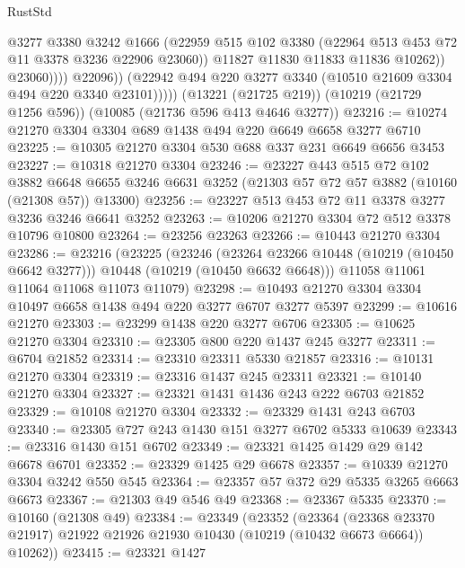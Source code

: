 \begin{lexlean}{RustStd}
\begin{coremodule}
                          @3277
                          @3380
                          @3242
                          @1666
                          (@22959
                            @515
                            @102
                            @3380
                            (@22964 @513 @453 @72 @11 @3378 @3236 @22906 @23060))
                          @11827
                          @11830
                          @11833
                          @11836
                          @10262))
                      @23060))))
              @22096))
          (@22942 @494 @220 @3277 @3340 (@10510 @21609 @3304 @494 @220 @3340 @23101)))))
    (@13221 (@21725 @219))
    (@10219 (@21729 @1256 @596))
    (@10085 (@21736 @596 @413 @4646 @3277))
@23216 := @10274 @21270 @3304 @3304 @689 @1438 @494 @220 @6649 @6658 @3277 @6710
@23225 := @10305 @21270 @3304 @530 @688 @337 @231 @6649 @6656 @3453
@23227 := @10318 @21270 @3304
@23246 := @23227
    @443
    @515
    @72
    @102
    @3882
    @6648
    @6655
    @3246
    @6631
    @3252
    (@21303 @57 @72 @57 @3882 (@10160 (@21308 @57)) @13300)
@23256 := @23227 @513 @453 @72 @11 @3378 @3277 @3236 @3246 @6641 @3252
@23263 := @10206 @21270 @3304 @72 @512 @3378 @10796 @10800
@23264 := @23256 @23263
@23266 := @10443 @21270 @3304
@23286 := @23216
    (@23225
      (@23246
        (@23264 @23266 @10448 (@10219 (@10450 @6642 @3277)))
        @10448
        (@10219 (@10450 @6632 @6648)))
      @11058
      @11061
      @11064
      @11068
      @11073
      @11079)
@23298 := @10493 @21270 @3304 @3304 @10497 @6658 @1438 @494 @220 @3277 @6707 @3277 @5397
@23299 := @10616 @21270
@23303 := @23299 @1438 @220 @3277 @6706
@23305 := @10625 @21270 @3304
@23310 := @23305 @800 @220 @1437 @245 @3277
@23311 := @6704 @21852
@23314 := @23310 @23311 @5330 @21857
@23316 := @10131 @21270 @3304
@23319 := @23316 @1437 @245 @23311
@23321 := @10140 @21270 @3304
@23327 := @23321 @1431 @1436 @243 @222 @6703 @21852
@23329 := @10108 @21270 @3304
@23332 := @23329 @1431 @243 @6703
@23340 := @23305 @727 @243 @1430 @151 @3277 @6702 @5333 @10639
@23343 := @23316 @1430 @151 @6702
@23349 := @23321 @1425 @1429 @29 @142 @6678 @6701
@23352 := @23329 @1425 @29 @6678
@23357 := @10339 @21270 @3304 @3242 @550 @545
@23364 := @23357 @57 @372 @29 @5335 @3265 @6663 @6673
@23367 := @21303 @49 @546 @49
@23368 := @23367 @5335
@23370 := @10160 (@21308 @49)
@23384 := @23349
    (@23352
      (@23364
        (@23368 @23370 @21917)
        @21922
        @21926
        @21930
        @10430
        (@10219 (@10432 @6673 @6664))
        @10262))
@23415 := @23321
    @1427

\end{coremodule}
\end{lexlean}
